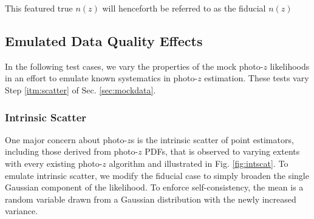 \documentclass[iop]{emulateapj}
\begin{document}
This featured true $n(z)$ will henceforth be referred to as the fiducial $n(z)$

\subsection{Emulated Data Quality Effects}
\label{sec:likelihoods}

In the following test cases, we vary the properties of the mock photo-$z$ likelihoods in an effort to emulate known systematics in photo-$z$ estimation.  These tests vary Step \ref{itm:scatter} of Sec. \ref{sec:mockdata}.

\subsubsection{Intrinsic Scatter}
\label{sec:intscat}

One major concern about photo-$z$s is the intrinsic scatter of point estimators, including those derived from photo-$z$ PDFs, that is observed to varying extents with every existing photo-$z$ algorithm and illustrated in Fig. \ref{fig:intscat}.  To emulate intrinsic scatter, we modify the fiducial case to simply broaden the single Gaussian component of the likelihood.  To enforce self-consistency, the mean is a random variable drawn from a Gaussian distribution with the newly increased variance.
\end{document}
